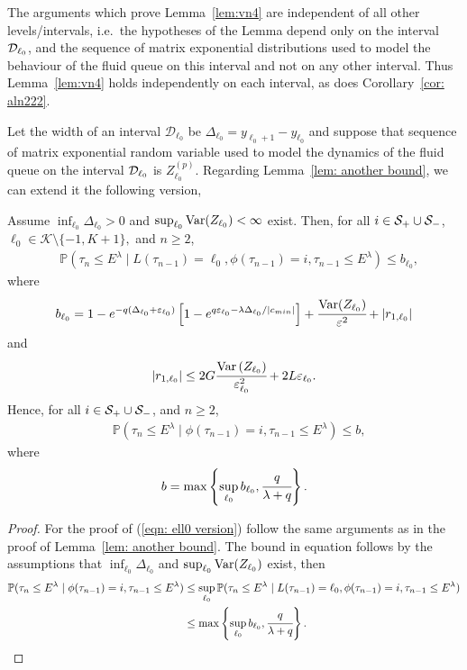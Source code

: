 The arguments which prove Lemma~\ref{lem:vn4} are independent of all other levels/intervals, i.e.~the hypotheses of the Lemma depend only on the interval \(\mathcal{D}_{\ell_0}\), and the sequence of matrix exponential distributions used to model the behaviour of the fluid queue on this interval and not on any other interval. Thus Lemma~\ref{lem:vn4} holds independently on each interval, as does Corollary~\ref{cor: aln222}.

Let the width of an interval \(\mathcal D_{\ell_0}\) be \(\Delta_{\ell_0}=y_{\ell_0+1}-y_{\ell_0}\) and suppose that sequence of matrix exponential random variable used to model the dynamics of the fluid queue on the interval \(\mathcal{D}_{\ell_0}\) is \(Z_{\ell_0}^{(p)}\). Regarding Lemma~\ref{lem: another bound}, we can extend it the following version, 
\begin{lem}\label{lem: another bound sdfg}
	Assume \(\inf_{\ell_0}\Delta_{\ell_0}>0\) and \(\sup_{\ell_0}\mathrm{Var}(Z_{\ell_0})<\infty\) exist. Then, for all \(i\in\mathcal S_+\cup \mathcal{S}_-\), \(\ell_0\in\mathcal K\setminus\{-1,K+1\},\) and \(n\geq 2\), 
	\begin{align}
		&\mathbb P(\tau_n\leq E^\lambda \mid L(\tau_{n-1}) = \ell_0, \phi(\tau_{n-1})=i, \tau_{n-1}\leq  E^\lambda ) \leq b_{\ell_0},\label{eqn: ell0 version}
	\end{align}
	where 
	\[b_{\ell_0} = 1-e^{-q(\Delta_{\ell_0}+\varepsilon_{\ell_0})}\left[1-e^{q\varepsilon_{\ell_0}-\lambda \Delta_{\ell_0}/|c_{min}|}\right] + \cfrac{\mathrm{Var}(Z_{\ell_0})}{\varepsilon^2} + |r_{1,\ell_0}| \]
	and  
	\[|r_{1,\ell_0}|\leq 2G\cfrac{\mathrm{Var} \left(Z_{\ell_0}\right)}{\varepsilon_{\ell_0}^2} + 2L\varepsilon_{\ell_0}.\]
	Hence, for all \(i\in\mathcal S_+\cup \mathcal{S}_-\), and \(n\geq 2\), 
	\begin{align}
		&\mathbb P(\tau_n\leq E^\lambda \mid \phi(\tau_{n-1})=i, \tau_{n-1}\leq  E^\lambda ) \leq b, \label{eqn: skjhg}
	\end{align}
	where 
	\[b = \max\left\{\sup_{\ell_0}b_{\ell_0}, \cfrac{q}{\lambda + q}\right\}.\]
\end{lem}
\begin{proof}
	For the proof of (\ref{eqn: ell0 version}) follow the same arguments as in the proof of Lemma~\ref{lem: another bound}. The bound in equation follows by the assumptions that \(\inf_{\ell_0}\Delta_{\ell_0}\) and \(\sup_{\ell_0}\mathrm{Var}(Z_{\ell_0})\) exist, then 
	\begin{align*}
		\mathbb P(\tau_n\leq E^\lambda \mid \phi(\tau_{n-1})=i, \tau_{n-1}\leq  E^\lambda ) 
		&\leq \sup_{\ell_0} \mathbb P(\tau_n\leq E^\lambda \mid L(\tau_{n-1}) = \ell_0, \phi(\tau_{n-1})=i, \tau_{n-1}\leq  E^\lambda ) 
		\\&\leq \max\left\{\sup_{\ell_0}b_{\ell_0}, \cfrac{q}{\lambda + q}\right\}.\label{eqn: ell0 versionlskhg}
	\end{align*}
\end{proof}
